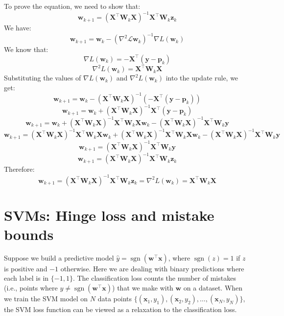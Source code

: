 \documentclass[a3paper,12pt]{extarticle} %
\begin{document}
To prove the equation, we need to show that:
\[
\mathbf{w}_{k+1} = (\mathbf{X}^\top \mathbf{W}_k \mathbf{X})^{-1} \mathbf{X}^\top \mathbf{W}_k \mathbf{z}_k
\]
We have:
\[
\mathbf{w}_{k+1} = \mathbf{w}_k - \left( \nabla^2\mathcal{L}\mathbf{w}_k \right)^{-1} \nabla L(\mathbf{w}_k)
\]
We know that:
\[
\nabla L(\mathbf{w}_k) = -\mathbf{X}^\top (\mathbf{y} - \mathbf{p}_k)
\]
\[
\nabla^2 L(\mathbf{w}_k) = \mathbf{X}^\top \mathbf{W}_k \mathbf{X}
\]
Substituting the values of \( \nabla L(\mathbf{w}_k) \) and \( \nabla^2 L(\mathbf{w}_k) \) into the update rule, we get:
\[
\mathbf{w}_{k+1} = \mathbf{w}_k - \left( \mathbf{X}^\top \mathbf{W}_k \mathbf{X} \right)^{-1} \left( -\mathbf{X}^\top (\mathbf{y} - \mathbf{p}_k) \right)
\]
\[
\mathbf{w}_{k+1} = \mathbf{w}_k + \left( \mathbf{X}^\top \mathbf{W}_k \mathbf{X} \right)^{-1} \mathbf{X}^\top (\mathbf{y} - \mathbf{p}_k)
\]
\[
\mathbf{w}_{k+1} = \mathbf{w}_k + \left( \mathbf{X}^\top \mathbf{W}_k \mathbf{X} \right)^{-1} \mathbf{X}^\top \mathbf{W}_k \mathbf{X} \mathbf{w}_k - \left( \mathbf{X}^\top \mathbf{W}_k \mathbf{X} \right)^{-1} \mathbf{X}^\top \mathbf{W}_k \mathbf{y}
\]
\[
\mathbf{w}_{k+1} = \left( \mathbf{X}^\top \mathbf{W}_k \mathbf{X} \right)^{-1} \mathbf{X}^\top \mathbf{W}_k \mathbf{X} \mathbf{w}_k + \left( \mathbf{X}^\top \mathbf{W}_k \mathbf{X} \right)^{-1} \mathbf{X}^\top \mathbf{W}_k \mathbf{X} \mathbf{w}_k - \left( \mathbf{X}^\top \mathbf{W}_k \mathbf{X} \right)^{-1} \mathbf{X}^\top \mathbf{W}_k \mathbf{y}
\]
\[
\mathbf{w}_{k+1} = \left( \mathbf{X}^\top \mathbf{W}_k \mathbf{X} \right)^{-1} \mathbf{X}^\top \mathbf{W}_k \mathbf{y}
\]
\[
\mathbf{w}_{k+1} = \left( \mathbf{X}^\top \mathbf{W}_k \mathbf{X} \right)^{-1} \mathbf{X}^\top \mathbf{W}_k \mathbf{z}_k
\]
Therefore:
\[
\mathbf{w}_{k+1} = (\mathbf{X}^\top \mathbf{W}_k \mathbf{X})^{-1} \mathbf{X}^\top \mathbf{W}_k \mathbf{z}_k = \nabla^2 L(\mathbf{w}_k) = \mathbf{X}^\top \mathbf{W}_k \mathbf{X}
\]

\newpage

\section{SVMs: Hinge loss and mistake bounds}
Suppose we build a predictive model $\hat{y} = \operatorname{sgn}(\mathbf{w}^\top \mathbf{x})$, where $\operatorname{sgn}(z) = 1$ if $z$ is positive and $-1$ otherwise. Here we are dealing with binary predictions where each label is in $\{-1, 1\}$. The classification loss counts the number of mistakes (i.e., points where $y \neq \operatorname{sgn}(\mathbf{w}^\top \mathbf{x})$) that we make with $\mathbf{w}$ on a dataset. When we train the SVM model on $N$ data points $\{(\mathbf{x}_1, y_1), (\mathbf{x}_2, y_2), \ldots, (\mathbf{x}_N, y_N)\}$, the SVM loss function can be viewed as a relaxation to the classification loss.
\end{document}
